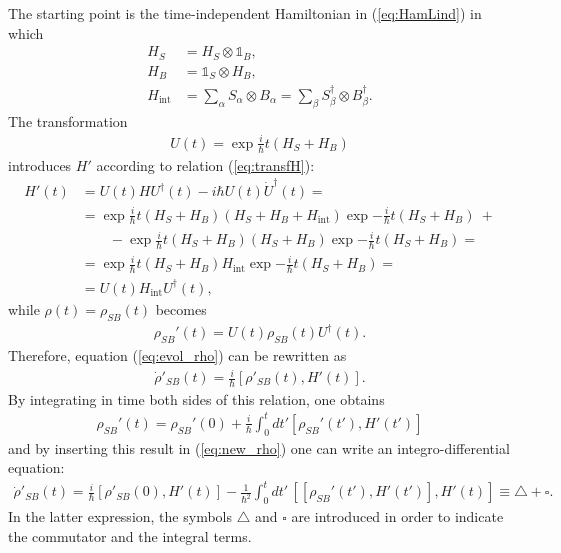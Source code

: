 The starting point is the time-independent Hamiltonian in (\ref{eq:HamLind}) in which 
\begin{align*}
    H_S &= H_S \otimes \mathbb{1}_B, \\
    H_B &= \mathbb{1}_S \otimes H_B, \\
    H_\text{int} &= \sum_\alpha S_\alpha \otimes B_\alpha = \sum_\beta S_\beta^\dagger \otimes B_\beta^\dagger.
\end{align*}
The transformation 
\begin{align*}
    U(t) = \exp{\frac{i}{\hbar}t(H_S + H_B)}
\end{align*}
introduces $H'$ according to relation (\ref{eq:transfH}): 
\begin{align*}
    H'(t) &= U(t) H U^\dagger(t) - i \hbar U(t) \dot{U}^\dagger(t) = \\
    &= \exp{\frac{i}{\hbar}t(H_S + H_B)} (H_S + H_B + H_\text{int}) \exp{-\frac{i}{\hbar}t(H_S + H_B)} ~+ \\
    & \qquad - \exp{\frac{i}{\hbar}t(H_S + H_B)} (H_S + H_B) \exp{-\frac{i}{\hbar}t(H_S + H_B)} = \\
    &= \exp{\frac{i}{\hbar}t(H_S + H_B)} H_\text{int} \exp{-\frac{i}{\hbar}t(H_S + H_B)} = \\
    &= U(t) H_\text{int} U^\dagger(t),
\end{align*}
while $\rho(t) = \rho_{SB}(t)$ becomes
\begin{align*}
     \rho_{SB}'(t) = U(t) 
{\rho}_{SB}(t) U^\dagger(t).
\end{align*}
Therefore, equation (\ref{eq:evol_rho}) can be rewritten as 
\begin{align}
    \dot{\rho}'_{SB}(t) = \frac{i}{\hbar} [{\rho}'_{SB}(t), H'(t)].
    \label{eq:new_rho}
\end{align}
By integrating in time both sides of this relation, one obtains
\begin{align*}
    \rho_{SB}'(t) = \rho_{SB}'(0) + \frac{i}{\hbar} \int_0^t dt'[\rho_{SB}'(t'), H'(t')] 
\end{align*}
and by inserting this result in (\ref{eq:new_rho}) one can write an integro-differential equation:
\begin{align*}
    \dot{\rho}'_{SB}(t) = \frac{i}{\hbar} [{\rho}'_{SB}(0), H'(t)] - \frac{1}{\hbar^2} \int_0^t dt' \, [[\rho_{SB}'(t'), H'(t')], H'(t)] \equiv \triangle + \square.
\end{align*}
In the latter expression, the symbols $\triangle$ and $\square$ are introduced in order to indicate the commutator and the integral terms. \\
